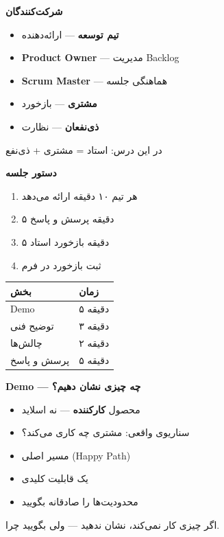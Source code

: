 \documentclass[14pt, a4paper, landscape]{extarticle}
\newcommand{\slide}[1]{%
    \newpage
    \begin{center}
    \begin{minipage}[t]{0.95\textwidth}
    \vspace{0.5cm}
    #1
    \vspace{0.5cm}
    \end{minipage}
    \end{center}
}
\newcommand{\slidetitle}[1]{%
    \begin{center}
        {\LARGE\bfseries\textcolor{primary}{#1}}
    \end{center}
    \vspace{0.5cm}
}
\newcommand{\myaccent}[1]{\textcolor{accent}{#1}}
\begin{document}
\slide{
    \slidetitle{شرکت‌کنندگان}
    \vspace{0.5cm}
    \begin{itemize}[itemsep=0.7em]
        \item {\large\textbf{تیم توسعه}} — ارائه‌دهنده
        \item {\large\textbf{Product Owner}} — مدیریت Backlog
        \item {\large\textbf{Scrum Master}} — هماهنگی جلسه
        \item {\large\textbf{مشتری}} — بازخورد
        \item {\large\textbf{ذی‌نفعان}} — نظارت
    \end{itemize}
    \vspace{0.8cm}
    \begin{center}
        {\myaccent{در این درس: استاد = مشتری + ذی‌نفع}}
    \end{center}
}

\slide{
    \slidetitle{دستور جلسه}
    \vspace{0.5cm}
    \begin{enumerate}[itemsep=0.5em]
        \item {\large هر تیم ۱۰ دقیقه ارائه می‌دهد}
        \item {\large ۵ دقیقه پرسش و پاسخ}
        \item {\large ۵ دقیقه بازخورد استاد}
        \item {\large ثبت بازخورد در فرم}
    \end{enumerate}
    \vspace{0.8cm}
    \begin{center}
        \begin{tabular}{ll}
            \toprule
            \textbf{بخش} & \textbf{زمان} \\
            \midrule
            Demo & ۵ دقیقه \\
            \hline
            توضیح فنی & ۳ دقیقه \\
            \hline
            چالش‌ها & ۲ دقیقه \\
            \hline
            پرسش و پاسخ & ۵ دقیقه \\
            \bottomrule
        \end{tabular}
    \end{center}
}

\slide{
    \slidetitle{Demo — چه چیزی نشان دهیم؟}
    \vspace{0.5cm}
    \begin{itemize}[itemsep=0.6em]
        \item {\large محصول \textbf{کارکننده} — نه اسلاید}
        \item {\large سناریوی واقعی: مشتری چه کاری می‌کند؟}
        \item {\large مسیر اصلی (Happy Path)}
        \item {\large یک قابلیت کلیدی}
        \item {\large محدودیت‌ها را صادقانه بگویید}
    \end{itemize}
    \vspace{0.8cm}
    \begin{center}
        {\large\myaccent{اگر چیزی کار نمی‌کند، نشان ندهید — ولی بگویید 
چرا.}}
    \end{center}
}
\end{document}
